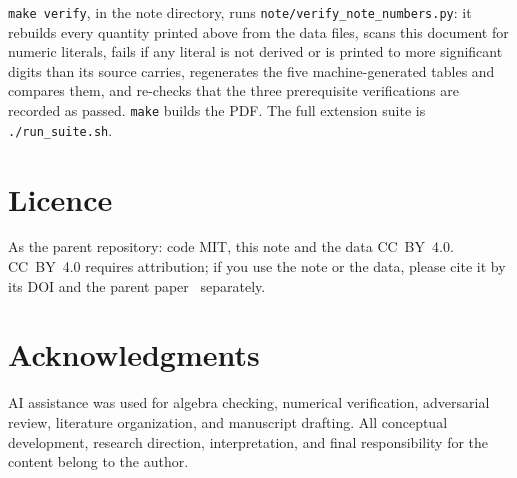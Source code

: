 \documentclass[11pt,a4paper]{article}
\theoremstyle{remark}
\newcommand{\src}[1]{{\footnotesize\texttt{#1}}}
\begin{document}
\noindent \texttt{make verify}, in the note directory, runs
\src{note/verify\_note\_numbers.py}: it rebuilds every quantity printed above from the data
files, scans this document for numeric literals, fails if any literal is not derived or is
printed to more significant digits than its source carries, regenerates the five
machine-generated tables and compares them, and re-checks that the three prerequisite
verifications are recorded as passed. \texttt{make} builds the PDF. The full extension
suite is \src{./run\_suite.sh}.

\section*{Licence}

As the parent repository: code MIT, this note and the data CC~BY~4.0. CC~BY~4.0 requires
attribution; if you use the note or the data, please cite it by its DOI and the parent
paper~\cite{deltaL3} separately.

\section*{Acknowledgments}

AI assistance was used for algebra checking, numerical verification, adversarial review,
literature organization, and manuscript drafting. All conceptual development, research
direction, interpretation, and final responsibility for the content belong to the author.
\end{document}
